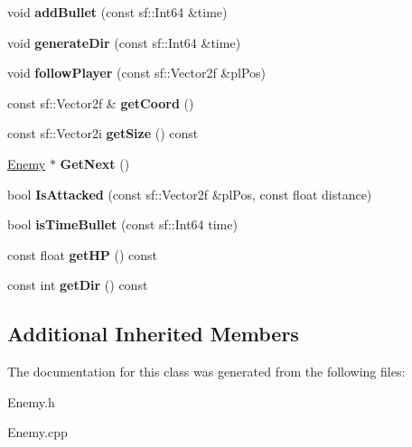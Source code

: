 \begin{DoxyCompactItemize}
\item 
\mbox{\label{class_enemy_a92203a84314188cd99c95390e0c78df4}} 
void {\bfseries add\+Bullet} (const sf\+::\+Int64 \&time)
\item 
\mbox{\label{class_enemy_a1bcb2bfb62fa715feee98525fd541eaa}} 
void {\bfseries generate\+Dir} (const sf\+::\+Int64 \&time)
\item 
\mbox{\label{class_enemy_a261b7c164def36e1badf7ad6f5081856}} 
void {\bfseries follow\+Player} (const sf\+::\+Vector2f \&pl\+Pos)
\item 
\mbox{\label{class_enemy_a8487c5726369ecf9d54d5da7320e7d53}} 
const sf\+::\+Vector2f \& {\bfseries get\+Coord} ()
\item 
\mbox{\label{class_enemy_ac58ecd2844e84278305739188abb0ed5}} 
const sf\+::\+Vector2i {\bfseries get\+Size} () const
\item 
\mbox{\label{class_enemy_a8404c22e8b03b56be9ad61738f6524e0}} 
\hyperlink{class_enemy}{Enemy} $\ast$ {\bfseries Get\+Next} ()
\item 
\mbox{\label{class_enemy_ab94c4bf66e1ec983e6d1fad9daf94c04}} 
bool {\bfseries Is\+Attacked} (const sf\+::\+Vector2f \&pl\+Pos, const float distance)
\item 
\mbox{\label{class_enemy_aa0e5bf304aede0e04c5b3ff7c4c4008b}} 
bool {\bfseries is\+Time\+Bullet} (const sf\+::\+Int64 time)
\item 
\mbox{\label{class_enemy_afefdcb8e4d8947dd4da80d2ceebb1219}} 
const float {\bfseries get\+HP} () const
\item 
\mbox{\label{class_enemy_a2e588a943b52172b117d768b1311681b}} 
const int {\bfseries get\+Dir} () const
\end{DoxyCompactItemize}
\subsection*{Additional Inherited Members}


The documentation for this class was generated from the following files\+:\begin{DoxyCompactItemize}
\item 
Enemy.\+h\item 
Enemy.\+cpp\end{DoxyCompactItemize}
